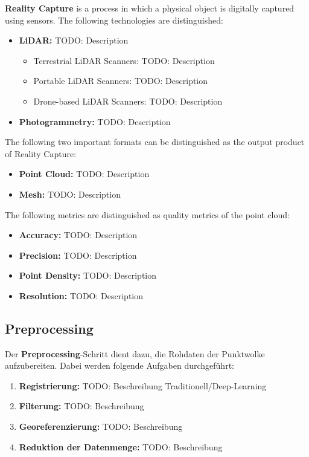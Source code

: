 \begin{English}
    \textbf{Reality Capture} is a process in which a physical object is digitally captured using sensors. The following technologies are distinguished: \cite{rashdiScanningTechnologiesBuilding2022}

    \begin{itemize}
        \item \textbf{LiDAR:} TODO: Description
        \begin{itemize}
            \item Terrestrial LiDAR Scanners: TODO: Description
            \item Portable LiDAR Scanners: TODO: Description
            \item Drone-based LiDAR Scanners: TODO: Description
        \end{itemize}
        \item \textbf{Photogrammetry:} TODO: Description
    \end{itemize}

    The following two important formats can be distinguished as the output product of Reality Capture:

    \begin{itemize}
        \item \textbf{Point Cloud:} TODO: Description
        \item \textbf{Mesh:} TODO: Description
    \end{itemize}

    The following metrics are distinguished as quality metrics of the point cloud:

    \begin{itemize}
        \item \textbf{Accuracy:} TODO: Description
        \item \textbf{Precision:} TODO: Description
        \item \textbf{Point Density:} TODO: Description
        \item \textbf{Resolution:} TODO: Description
    \end{itemize}
\end{English}

\subsection{Preprocessing}
\begin{German}
    Der \textbf{Preprocessing}-Schritt dient dazu, die Rohdaten der Punktwolke aufzubereiten. Dabei werden folgende Aufgaben durchgeführt:

    \begin{enumerate}
        \item \textbf{Registrierung:} TODO: Beschreibung Traditionell/Deep-Learning
        \item \textbf{Filterung:} TODO: Beschreibung
        \item \textbf{Georeferenzierung:} TODO: Beschreibung
        \item \textbf{Reduktion der Datenmenge:} TODO: Beschreibung
    \end{enumerate}

\end{German}

